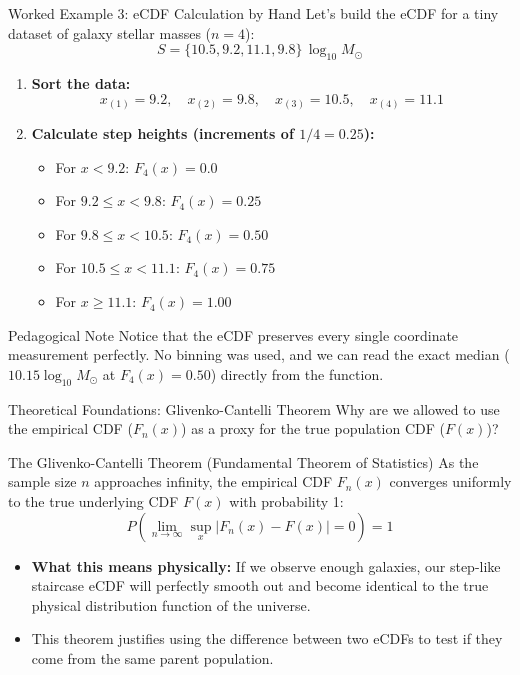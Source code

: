 \documentclass[9pt]{beamer}
\begin{document}
\begin{frame}{Worked Example 3: eCDF Calculation by Hand}
  Let's build the eCDF for a tiny dataset of galaxy stellar masses ($n = 4$):
  $$S = \{10.5, 9.2, 11.1, 9.8\} \, \log_{10} M_\odot$$
  \begin{enumerate}
    \item \textbf{Sort the data:}
      $$x_{(1)} = 9.2, \quad x_{(2)} = 9.8, \quad x_{(3)} = 10.5, \quad x_{(4)} = 11.1$$
    \item \textbf{Calculate step heights (increments of $1/4 = 0.25$):}
      \begin{itemize}
        \item For $x < 9.2$: $F_4(x) = 0.0$
        \item For $9.2 \le x < 9.8$: $F_4(x) = 0.25$
        \item For $9.8 \le x < 10.5$: $F_4(x) = 0.50$
        \item For $10.5 \le x < 11.1$: $F_4(x) = 0.75$
        \item For $x \ge 11.1$: $F_4(x) = 1.00$
      \end{itemize}
  \end{enumerate}
  \begin{block}{Pedagogical Note}
    Notice that the eCDF preserves every single coordinate measurement perfectly. No binning was used, and we can read the exact median ($10.15 \log_{10} M_\odot$ at $F_4(x)=0.50$) directly from the function.
  \end{block}
\end{frame}

\begin{frame}{Theoretical Foundations: Glivenko-Cantelli Theorem}
  Why are we allowed to use the empirical CDF ($F_n(x)$) as a proxy for the true population CDF ($F(x)$)?
  \begin{block}{The Glivenko-Cantelli Theorem (Fundamental Theorem of Statistics)}
    As the sample size $n$ approaches infinity, the empirical CDF $F_n(x)$ converges uniformly to the true underlying CDF $F(x)$ with probability 1:
    $$P\left( \lim_{n \to \infty} \sup_{x} |F_n(x) - F(x)| = 0 \right) = 1$$
  \end{block}
  \begin{itemize}
    \item \textbf{What this means physically:}
      If we observe enough galaxies, our step-like staircase eCDF will perfectly smooth out and become identical to the true physical distribution function of the universe.
    \item This theorem justifies using the difference between two eCDFs to test if they come from the same parent population.
  \end{itemize}
\end{frame}
\end{document}
